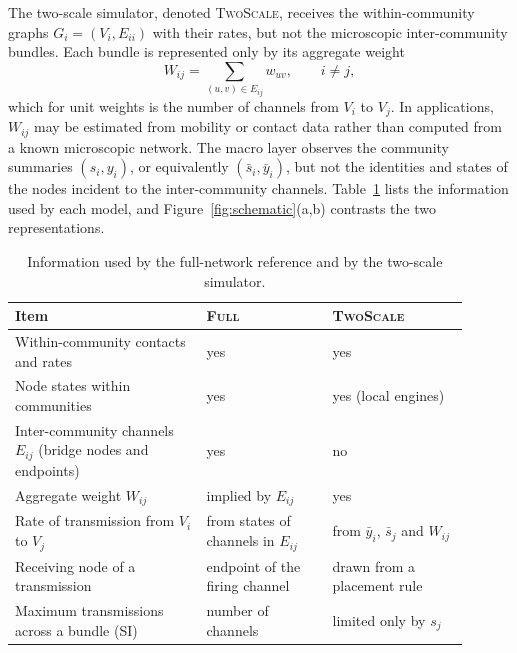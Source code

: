 \documentclass[a4paper,fleqn]{cas-sc}
\newcommand{\ibar}{\bar{y}}
\newcommand{\sbar}{\bar{s}}
\newcommand{\Full}{\textup{\textsc{Full}}}
\newcommand{\TS}{\textup{\textsc{TwoScale}}}
\begin{document}
The two-scale simulator, denoted \TS{}, receives the within-community graphs $G_i=(V_i,E_{ii})$ with their rates, but not the microscopic inter-community bundles. Each bundle is represented only by its aggregate weight
\begin{equation}
\label{eq:weight}
W_{ij}=\sum_{(u,v)\in E_{ij}}w_{uv},\qquad i\neq j,
\end{equation}
which for unit weights is the number of channels from $V_i$ to $V_j$. In applications, $W_{ij}$ may be estimated from mobility or contact data rather than computed from a known microscopic network. The macro layer observes the community summaries $(s_i,y_i)$, or equivalently $(\sbar_i,\ibar_i)$, but not the identities and states of the nodes incident to the inter-community channels. Table~\ref{tab:information} lists the information used by each model, and Figure~\ref{fig:schematic}(a,b) contrasts the two representations.

\begin{table}[tbp]
\centering
\caption{Information used by the full-network reference and by the two-scale simulator.}
\label{tab:information}
\small
\begin{tabular}{>{\raggedright\arraybackslash}p{0.38\linewidth}>{\raggedright\arraybackslash}p{0.25\linewidth}>{\raggedright\arraybackslash}p{0.27\linewidth}}
\toprule
Item & \Full{} & \TS{}\\
\midrule
Within-community contacts and rates & yes & yes\\
Node states within communities & yes & yes (local engines)\\
Inter-community channels $E_{ij}$ (bridge nodes and endpoints) & yes & no\\
Aggregate weight $W_{ij}$ & implied by $E_{ij}$ & yes\\
Rate of transmission from $V_i$ to $V_j$ & from states of channels in $E_{ij}$ & from $\ibar_i$, $\sbar_j$ and $W_{ij}$\\
Receiving node of a transmission & endpoint of the firing channel & drawn from a placement rule\\
Maximum transmissions across a bundle (SI) & number of channels & limited only by $s_j$\\
\bottomrule
\end{tabular}
\end{table}
\end{document}
